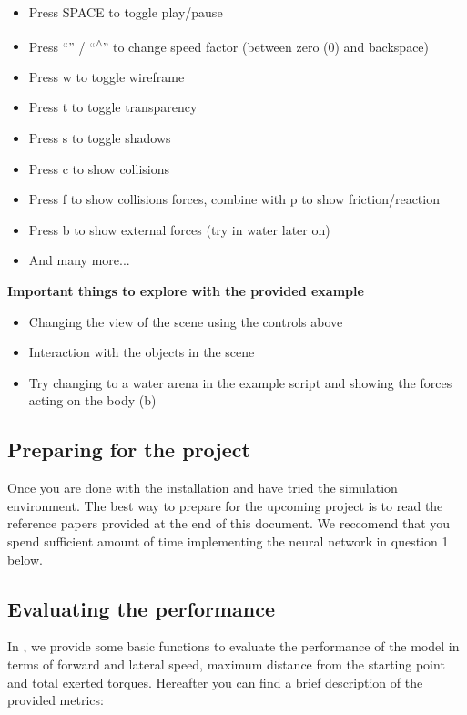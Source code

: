 \documentclass{cmc}
\begin{document}
\begin{itemize}
\item Press SPACE to toggle play/pause
\item Press ``\textquotesingle'' / ``\textsuperscript{$\wedge$}'' to change
  speed factor (between zero (0) and backspace)
\item Press w to toggle wireframe
\item Press t to toggle transparency
\item Press s to toggle shadows
\item Press c to show collisions
\item Press f to show collisions forces, combine with p to show
  friction/reaction
\item Press b to show external forces (try in water later on)
\item And many more...
\end{itemize}

\textbf{Important things to explore with the provided example}
\begin{itemize}
\item Changing the view of the scene using the controls above
\item Interaction with the objects in the scene
\item Try changing to a water arena in the example script and showing the forces
  acting on the body (b)
\end{itemize}

\subsection*{Preparing for the project}
Once you are done with the installation and have tried the simulation
environment. The best way to prepare for the upcoming project is to read the reference papers
provided at the end of this document. We reccomend that you spend sufficient amount
of time implementing the neural network in question 1 below.


\subsection*{Evaluating the performance}
In , we provide some basic functions to evaluate the performance
of the model in terms of forward and lateral speed, maximum distance from the starting point and total exerted torques.
Hereafter you can find a brief description of the provided metrics:
\end{document}
